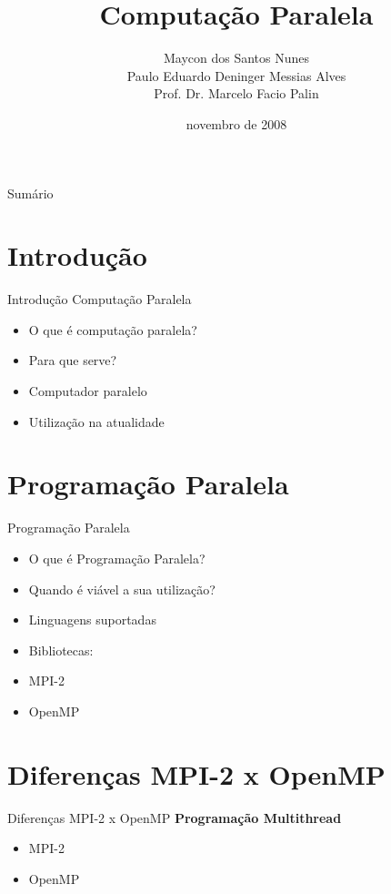\documentclass{beamer}
\date{novembro de 2008}
\author[Maycon Santos\\Paulo Deininger\\Prof.Dr.Palin]{Maycon dos Santos Nunes\\Paulo Eduardo Deninger Messias Alves\\Prof. Dr. Marcelo Facio Palin}
\institute
{
  \texttt{<maycon261@gmail.com\\paulodeininger@gmail.com\\profpalin@gmail.com>}\\
  .\\%
  \url{http://www.drumond.com.br/}\\
  Faculdade Drummond.
}
\begin{document}
\title[Trabalho de Conclusão]{Computação Paralela}

\begin{frame}{Sumário}
\tableofcontents
\end{frame}

\section{Introdução}

\begin{frame}{Introdução}
  Computação Paralela
  \begin{itemize}
    \item O que é computação paralela?
    \item Para que serve?
    \item Computador paralelo
    \item Utilização na atualidade
  \end{itemize}
\end{frame}

\section{Programação Paralela}

\begin{frame}{Programa\c{c}\~ao Paralela}
  \begin{itemize}
    \item O que é Programação Paralela?
    \item Quando é viável a sua utilização?
    \item Linguagens suportadas
       \item Bibliotecas:
          \item MPI-2
	  \item OpenMP
  \end{itemize}
\end{frame}

\section{Diferenças MPI-2 x OpenMP}
\begin{frame}{Diferenças MPI-2 x OpenMP}
\textbf{Programação Multithread}
  \begin{itemize}
       \item MPI-2 
       \item OpenMP 
  \end{itemize}
\end{frame}
\end{document}
